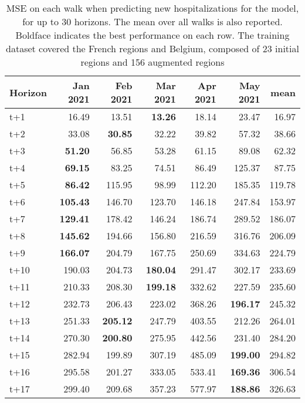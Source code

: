 \begin{table}[H]
\centering
\caption{MSE on each walk when predicting new hospitalizations for the model, for up to 30 horizons. The mean over all walks is also reported. Boldface indicates the best performance on each row. The training dataset covered the French regions and Belgium, composed of 23 initial regions and 156 augmented regions }
\label{tab:MSE_walk_assembly_2}
\begin{tabular}{lrrrrrr}
\toprule
Horizon &  Jan 2021 &  Feb 2021 &  Mar 2021 &  Apr 2021 &  May 2021 &   mean \\
\midrule
t+1  & 16.49  & 13.51  & \textbf{13.26}  & 18.14  & 23.47  & 16.97  \\
t+2  & 33.08  & \textbf{30.85}  & 32.22  & 39.82  & 57.32  & 38.66  \\
t+3  & \textbf{51.20}  & 56.85  & 53.28  & 61.15  & 89.08  & 62.32  \\
t+4  & \textbf{69.15}  & 83.25  & 74.51  & 86.49  & 125.37  & 87.75  \\
t+5  & \textbf{86.42}  & 115.95  & 98.99  & 112.20  & 185.35  & 119.78  \\
t+6  & \textbf{105.43}  & 146.70  & 123.70  & 146.18  & 247.84  & 153.97  \\
t+7  & \textbf{129.41}  & 178.42  & 146.24  & 186.74  & 289.52  & 186.07  \\
t+8  & \textbf{145.62}  & 194.66  & 156.80  & 216.59  & 316.76  & 206.09  \\
t+9  & \textbf{166.07}  & 204.79  & 167.75  & 250.69  & 334.63  & 224.79  \\
t+10  & 190.03  & 204.73  & \textbf{180.04}  & 291.47  & 302.17  & 233.69  \\
t+11  & 210.33  & 208.30  & \textbf{199.18}  & 332.62  & 227.59  & 235.60  \\
t+12  & 232.73  & 206.43  & 223.02  & 368.26  & \textbf{196.17}  & 245.32  \\
t+13  & 251.33  & \textbf{205.12}  & 247.79  & 403.55  & 212.26  & 264.01  \\
t+14  & 270.30  & \textbf{200.80}  & 275.95  & 442.56  & 231.40  & 284.20  \\
t+15  & 282.94  & 199.89  & 307.19  & 485.09  & \textbf{199.00}  & 294.82  \\
t+16  & 295.58  & 201.27  & 333.05  & 533.41  & \textbf{169.36}  & 306.54  \\
t+17  & 299.40  & 209.68  & 357.23  & 577.97  & \textbf{188.86}  & 326.63  \\

\end{tabular}
\end{table}
